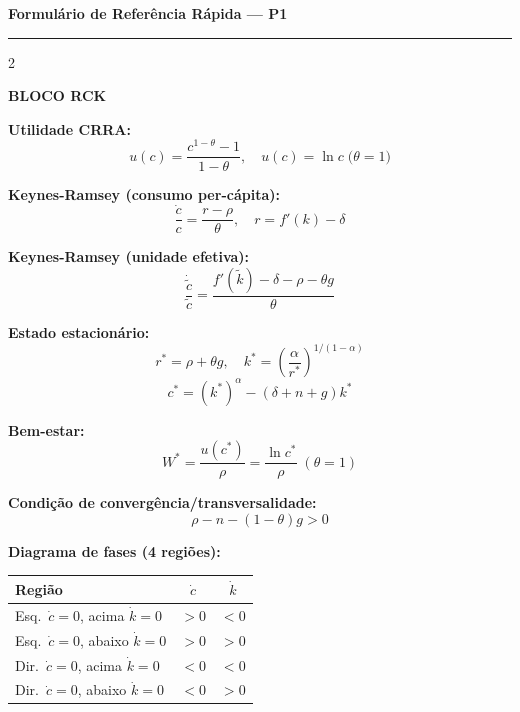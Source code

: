 \documentclass[12pt, a4paper]{article}
\newcommand{\rstar}{r^*}
\newcommand{\kstar}{k^*}
\newcommand{\cstar}{c^*}
\begin{document}
\newpage
\thispagestyle{fancy}

\begin{center}
{\large\bfseries\color{cyanrbc} Formulário de Referência Rápida --- P1}\\[0.3em]
\rule{\linewidth}{0.6pt}
\end{center}

\vspace{0.3em}
\begin{multicols}{2}

\textbf{\textcolor{cyanrbc}{BLOCO RCK}}

\medskip
\textbf{Utilidade CRRA:}
\[
u(c) = \frac{c^{1-\theta}-1}{1-\theta}, \quad u(c)=\ln c \;\text{(}\theta=1\text{)}
\]

\textbf{Keynes-Ramsey (consumo per-cápita):}
\[
\frac{\dot{c}}{c} = \frac{r - \rho}{\theta}, \quad r = f'(k)-\delta
\]

\textbf{Keynes-Ramsey (unidade efetiva):}
\[
\frac{\dot{\tilde{c}}}{\tilde{c}} = \frac{f'(\tilde{k}) - \delta - \rho - \theta g}{\theta}
\]

\textbf{Estado estacionário:}
\[
\rstar = \rho + \theta g, \quad \kstar = \!\left(\frac{\alpha}{\rstar}\right)^{\!1/(1-\alpha)}
\]
\[
\cstar = (\kstar)^\alpha - (\delta+n+g)\kstar
\]

\textbf{Bem-estar:}
\[
W^* = \frac{u(\cstar)}{\rho} = \frac{\ln\cstar}{\rho} \;(\theta{=}1)
\]

\textbf{Condição de convergência/transversalidade:}
\[
\rho - n - (1-\theta)g > 0
\]

\textbf{Diagrama de fases (4 regiões):}

\begin{center}
\begin{tabular}{p{2.8cm}cc}
\toprule
Região & $\dot{c}$ & $\dot{k}$ \\
\midrule
Esq.\ $\dot{c}=0$, acima $\dot{k}=0$ & $>0$ & $<0$ \\
Esq.\ $\dot{c}=0$, abaixo $\dot{k}=0$ & $>0$ & $>0$ \\
Dir.\ $\dot{c}=0$, acima $\dot{k}=0$ & $<0$ & $<0$ \\
Dir.\ $\dot{c}=0$, abaixo $\dot{k}=0$ & $<0$ & $>0$ \\
\bottomrule
\end{tabular}
\end{center}


\end{multicols}
\end{document}
